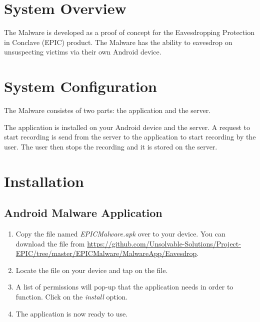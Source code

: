 \documentclass[a4paper,12pt,titlepage]{article}
\begin{document}

\tableofcontents



\newpage
\section{System Overview}
The Malware is developed as a proof of concept for the Eavesdropping Protection in Conclave (EPIC) product. 
The Malware has the ability to eavesdrop on unsuspecting victims via their own Android device.

\section{System Configuration}
The Malware consistes of two parts: the application and the server.

The application is installed on your Android device and the server. A request to start recording is send from the server to the application to start recording by the user. The user then stops the recording and it is stored on the server.

\section{Installation}

\subsection{Android Malware Application}
\begin{enumerate}
\item Copy the file named \textit{EPICMalware.apk} over to your device. You can download the file from \url{https://github.com/Unsolvable-Solutions/Project-EPIC/tree/master/EPICMalware/MalwareApp/Eavesdrop}.
\item Locate the file on your device and tap on the file.
\item A list of permissions will pop-up that the application needs in order to function. Click on the \textit{install} option.
\item The application is now ready to use.
\end{enumerate}
\end{document}
